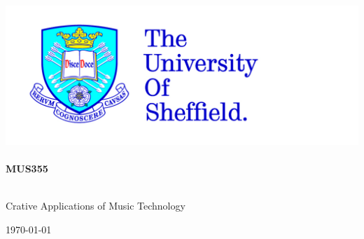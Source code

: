 
\begin{titlepage}

\begin{center}



\includegraphics[scale=0.2]{tuoslogo_cmyk_hi} \\




\HRule \\[0.4cm]
{ \huge \bfseries MUS355}\\[0.4cm]

\HRule \\[1.5cm]

\begin{minipage}{0.6\textwidth}
\begin{flushleft} \large
Crative Applications of Music Technology\\
\end{flushleft}
\end{minipage}

\vfill

{\large \today}

\end{center}

\end{titlepage}
